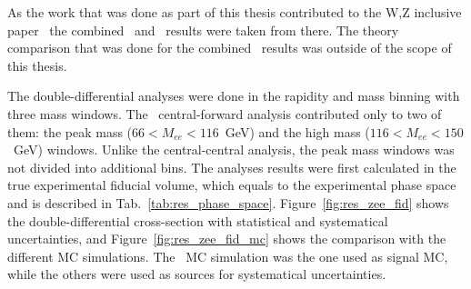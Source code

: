 \begin{figure}
\end{figure}

As the work that was done as part of this thesis contributed to the W,Z inclusive paper~\cite{lib:wz2011} the combined \Zee\ and \Zll\ results were taken from there. The theory comparison that was done for the combined \Zll\ results was outside of the scope of this thesis.

The double-differential analyses were done in the rapidity and mass binning with three mass windows. The \Zee\ central-forward analysis contributed only to two of them: the peak mass ($66 < M_{ee} < 116$~GeV) and the high mass ($116 < M_{ee} < 150$~GeV) windows. Unlike the central-central analysis, the peak mass windows was not divided into additional bins. The analyses results were first calculated in the true experimental fiducial volume, which equals to the experimental phase space and is described in Tab.~\ref{tab:res_phase_space}. Figure~\ref{fig:res_zee_fid} shows the double-differential cross-section with statistical and systematical uncertainties, and Figure~\ref{fig:res_zee_fid_mc} shows the comparison with the different MC simulations. The \Powheg\Pythia\ MC simulation was the one used as signal MC, while the others were used as sources for systematical uncertainties.

